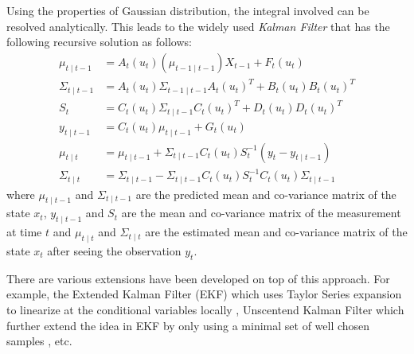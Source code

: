 Using the properties of Gaussian distribution, the integral involved can be resolved analytically. This leads to the widely used \emph{Kalman Filter} \cite{KRE60} that has the following recursive solution as follows:
\begin{align}
  \mu_{t \mid t -1} &= A_{t}(u_t)(\mu_{t-1 \mid t-1})X_{t-1} + F_t(u_t) \\
  \Sigma_{t \mid t -1} &= A_{t}(u_t)\Sigma_{t -1 \mid t -1}A_{t}(u_t)^T +  B_t(u_t)B_t(u_t)^T \\
  S_t &=  C_{t}(u_t)\Sigma_{t \mid t -1}C_{t}(u_t)^T +  D_t(u_t)D_t(u_t)^T \\
  y_{t \mid t-1} &=  C_{t}(u_t)  \mu_{t \mid t-1} + G_t(u_t) \\
  \mu_{t \mid t} &=   \mu_{t \mid t -1} +   \Sigma_{t \mid t -1} C_{t}(u_t)S_t^{-1}(y_t - y_{t \mid t-1}) \\
  \Sigma_{t \mid t} &=  \Sigma_{t \mid t -1} -\Sigma_{t \mid t -1} C_{t}(u_t)S_t^{-1} C_{t}(u_t)\Sigma_{t \mid t -1}
\end{align}
where  $\mu_{t \mid t -1}$ and $\Sigma_{t \mid t -1}$ are the predicted mean and co-variance matrix of the state $x_t$, $y_{t \mid t-1}$ and $S_t$ are the mean and co-variance matrix of the measurement at time $t$ and $\mu_{t \mid t}$ and $\Sigma_{t \mid t}$ are the estimated mean and co-variance matrix of the state $x_t$ after seeing the observation $y_t$.

There are various extensions have been developed on top of this approach. For example, the Extended Kalman Filter (EKF) which uses Taylor Series expansion to linearize at the conditional variables locally \cite{WG95}, Unscentend Kalman Filter which further extend the idea in EKF by only using a minimal set of well chosen samples \cite{EW01}, etc.

